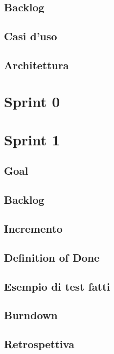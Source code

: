 \documentclass{article}
\begin{document}
\subsection{Backlog}

\subsection{Casi d'uso}

\subsection{Architettura}

\section{Sprint 0}

\section{Sprint 1}

\subsection{Goal}

\subsection{Backlog}

\subsection{Incremento}

\subsection{Definition of Done}

\subsection{Esempio di test fatti}

\subsection{Burndown}

\subsection{Retrospettiva}
\end{document}
